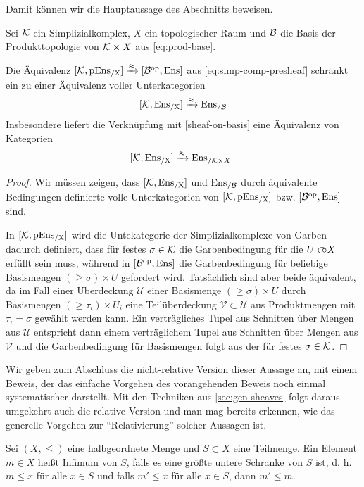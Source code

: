 Damit können wir die Hauptaussage des Abschnitts beweisen.
\begin{satz} \label{simp-comp-sheaf}
  Sei $\mathcal{K}$ ein Simplizialkomplex, $X$ ein topologischer Raum und $\mathcal{B}$
  die Basis der Produkttopologie von $\mathcal{K} \times X$ aus
  \autoref{eq:prod-base}.

  Die Äquivalenz $[\mathcal{K}, \operatorname{pEns_{/X}}] \xrightarrow{\approx} [\mathcal{B}^\mathrm{op}, \operatorname{Ens}]$ aus
  \autoref{eq:simp-comp-presheaf} schränkt ein zu einer Äquivalenz
  voller Unterkategorien
  \[
    [\mathcal{K}, \operatorname{Ens_{/X}}] \xrightarrow{\approx} \operatorname{Ens_{/\mathcal{B}}}
  \]
  Insbesondere liefert die Verknüpfung mit \ref{sheaf-on-basis} eine
  Äquivalenz von Kategorien
  \[ [\mathcal{K}, \operatorname{Ens_{/X}}] \xrightarrow{\approx} \operatorname{Ens}_{/\mathcal{K} \times X} . \]
\end{satz}
\begin{proof}
  Wir müssen zeigen, dass $[\mathcal{K}, \operatorname{Ens_{/X}}]$ und $\operatorname{Ens_{/\mathcal{B}}}$ durch äquivalente
  Bedingungen definierte volle Unterkategorien von $[\mathcal{K}, \operatorname{pEns_{/X}}]$
  bzw. $[\mathcal{B}^\mathrm{op}, \operatorname{Ens}]$ sind.

  In $[\mathcal{K}, \operatorname{pEns_{/X}}]$ wird die Untekategorie der Simplizialkomplexe von
  Garben dadurch definiert, dass für festes $\sigma \in \mathcal{K}$ die
  Garbenbedingung für die $U \subset\kern-0.58em\circ X$ erfüllt sein muss, während in
  $[\mathcal{B}^\mathrm{op}, \operatorname{Ens}]$ die Garbenbedingung für beliebige Basismengen $(\geq
  \sigma) \times U$ gefordert wird. Tatsächlich sind aber beide
  äquivalent, da im Fall einer Überdeckung $\mathcal{U}$ einer
  Basismenge $(\geq \sigma) \times U$ durch Basismengen $(\geq \tau_i)
  \times U_i$ eine Teilüberdeckung $\mathcal{V} \subset \mathcal{U}$
  aus Produktmengen mit $\tau_i = \sigma$ gewählt werden kann. Ein
  verträgliches Tupel aus Schnitten über Mengen aus $\mathcal{U}$
  entspricht dann einem verträglichem Tupel aus Schnitten über Mengen
  aus $\mathcal{V}$ und die Garbenbedingung für Basismengen folgt aus
  der für festes $\sigma \in \mathcal{K}$.
\end{proof}
Wir geben zum Abschluss die nicht-relative Version dieser Aussage an,
mit einem Beweis, der das einfache Vorgehen des vorangehenden Beweis
noch einmal systematischer darstellt. Mit den Techniken aus
\autoref{sec:gen-sheaves} folgt daraus umgekehrt auch die relative
Version und man mag bereits erkennen, wie das generelle Vorgehen zur
``Relativierung'' solcher Aussagen ist.
\begin{defn}
  Sei $(X, \leq)$ eine halbgeordnete Menge und $S \subset X$ eine
  Teilmenge. Ein Element $m \in X$ heißt Infimum von $S$, falls es
  eine größte untere Schranke von $S$ ist, d. h. $m \leq x$ für alle
  $x \in S$ und falls $m' \leq x$ für alle $x \in S$, dann $m' \leq
  m$.
\end{defn}
